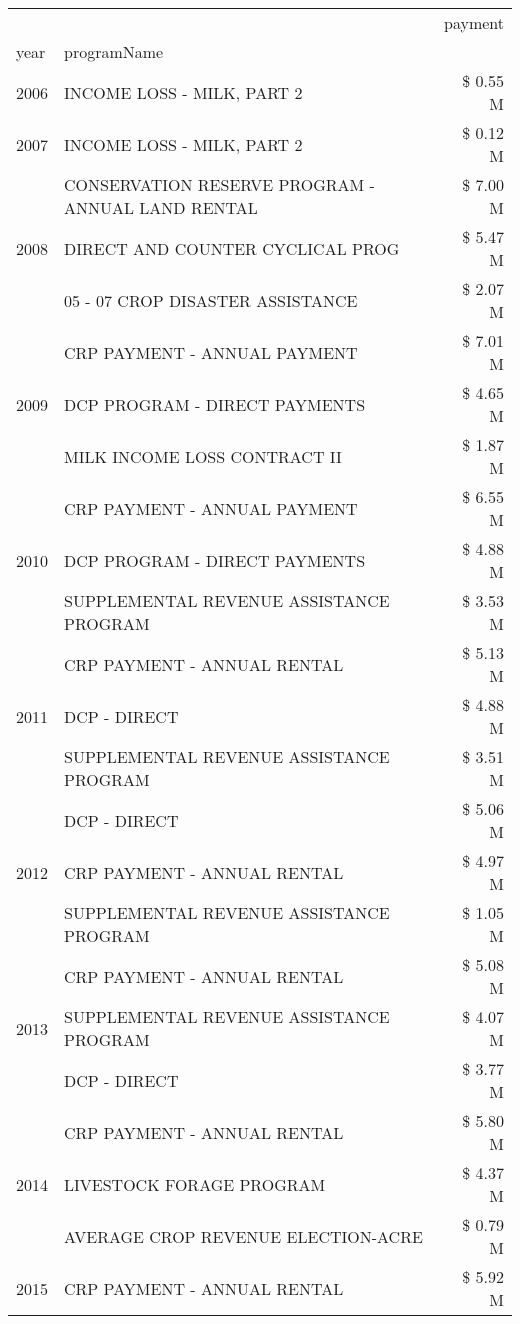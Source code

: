 \begin{tabular}{llr}
\toprule
 &  & payment \\
year & programName &  \\
\midrule
2006 & INCOME LOSS - MILK, PART 2 & \$ 0.55 M \\
\cline{1-3}
2007 & INCOME LOSS - MILK, PART 2 & \$ 0.12 M \\
\cline{1-3}
\multirow[t]{3}{*}{2008} & CONSERVATION RESERVE PROGRAM - ANNUAL LAND RENTAL & \$ 7.00 M \\
 & DIRECT AND COUNTER CYCLICAL PROG & \$ 5.47 M \\
 & 05 - 07 CROP DISASTER ASSISTANCE & \$ 2.07 M \\
\cline{1-3}
\multirow[t]{3}{*}{2009} & CRP PAYMENT - ANNUAL PAYMENT & \$ 7.01 M \\
 & DCP PROGRAM - DIRECT PAYMENTS & \$ 4.65 M \\
 & MILK INCOME LOSS CONTRACT II & \$ 1.87 M \\
\cline{1-3}
\multirow[t]{3}{*}{2010} & CRP PAYMENT - ANNUAL PAYMENT & \$ 6.55 M \\
 & DCP PROGRAM - DIRECT PAYMENTS & \$ 4.88 M \\
 & SUPPLEMENTAL REVENUE ASSISTANCE PROGRAM & \$ 3.53 M \\
\cline{1-3}
\multirow[t]{3}{*}{2011} & CRP PAYMENT - ANNUAL RENTAL & \$ 5.13 M \\
 & DCP - DIRECT & \$ 4.88 M \\
 & SUPPLEMENTAL REVENUE ASSISTANCE PROGRAM & \$ 3.51 M \\
\cline{1-3}
\multirow[t]{3}{*}{2012} & DCP - DIRECT & \$ 5.06 M \\
 & CRP PAYMENT - ANNUAL RENTAL & \$ 4.97 M \\
 & SUPPLEMENTAL REVENUE ASSISTANCE PROGRAM & \$ 1.05 M \\
\cline{1-3}
\multirow[t]{3}{*}{2013} & CRP PAYMENT - ANNUAL RENTAL & \$ 5.08 M \\
 & SUPPLEMENTAL REVENUE ASSISTANCE PROGRAM & \$ 4.07 M \\
 & DCP - DIRECT & \$ 3.77 M \\
\cline{1-3}
\multirow[t]{3}{*}{2014} & CRP PAYMENT - ANNUAL RENTAL & \$ 5.80 M \\
 & LIVESTOCK FORAGE PROGRAM & \$ 4.37 M \\
 & AVERAGE CROP REVENUE ELECTION-ACRE & \$ 0.79 M \\
\cline{1-3}
\multirow[t]{3}{*}{2015} & CRP PAYMENT - ANNUAL RENTAL & \$ 5.92 M \\

\end{tabular}
